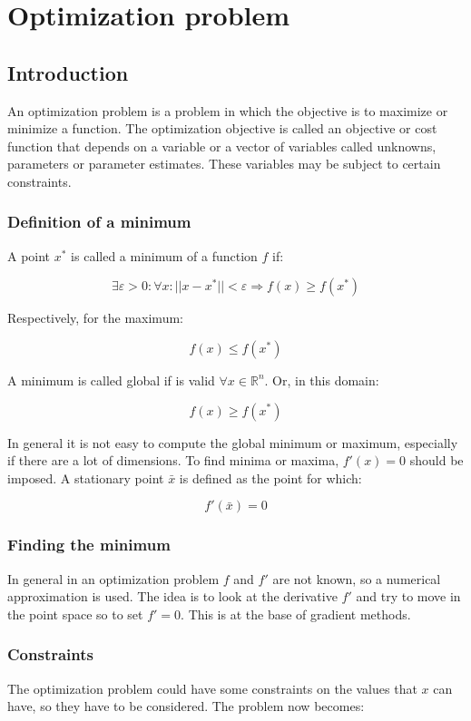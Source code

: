 \chapter{Optimization problem}

\section{Introduction}
An optimization problem is a problem in which the objective is to maximize or minimize a function.
The optimization objective is called an objective or cost function that depends on a variable or a vector of variables called unknowns, parameters or parameter estimates.
These variables may be subject to certain constraints.

  \subsection{Definition of a minimum}
  A point $x^*$ is called a minimum of a function $f$ if:

  $$\exists \varepsilon > 0 : \forall x : || x- x^* || < \varepsilon\Rightarrow f(x) \geq f(x^*)$$

  Respectively, for the maximum:

  $$f(x) \leq f(x^*)$$

  A minimum is called global if is valid $\forall x \in \mathbb{R}^n$.
  Or, in this domain:

  $$f(x) \geq f(x^*)$$

  In general it is not easy to compute the global minimum or maximum, especially if there are a lot of dimensions.
  To find minima or maxima, $f'(x)=0$ should be imposed.
  A stationary point $\bar{x}$ is defined as the point for which:

  $$f'(\bar{x})=0$$

  \subsection{Finding the minimum}
  In general in an optimization problem $f$ and $f'$ are not known, so a numerical approximation is used.
  The idea is to look at the derivative $f'$ and try to move in the point space so to set $f'=0$.
  This is at the base of gradient methods.

  \subsection{Constraints}
  The optimization problem could have some constraints on the values that $x$ can have, so they have to be considered.
  The problem now becomes:

